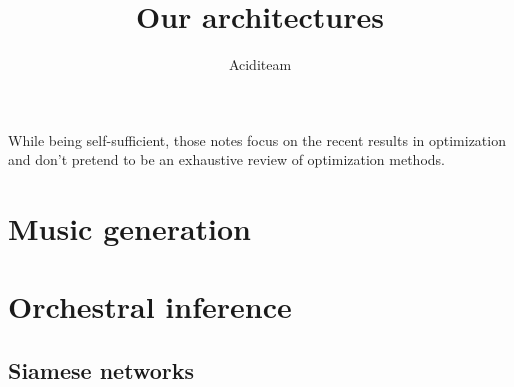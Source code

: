 \documentclass{report}
\title{Our architectures}
\author{Aciditeam}
\begin{document}
\maketitle
While being self-sufficient, those notes focus on the recent results in optimization and don't pretend to be an exhaustive review of optimization methods.


\chapter{Music generation}

\chapter{Orchestral inference}
\section{Siamese networks}
\end{document}
